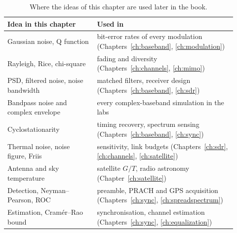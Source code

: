\begin{table}[htbp]\centering\small
\caption{Where the ideas of this chapter are used later in the book.}
\label{tab:ch03:roadmap}
\begin{tabular}{@{}p{0.36\linewidth}p{0.56\linewidth}@{}}
\toprule
Idea in this chapter & Used in \\
\midrule
Gaussian noise, Q function & bit-error rates of every modulation (Chapters~\ref{ch:baseband}, \ref{ch:modulation})\\
Rayleigh, Rice, chi-square & fading and diversity (Chapters~\ref{ch:channels}, \ref{ch:mimo})\\
PSD, filtered noise, noise bandwidth & matched filters, receiver design (Chapters~\ref{ch:baseband}, \ref{ch:sdr})\\
Bandpass noise and complex envelope & every complex-baseband simulation in the labs\\
Cyclostationarity & timing recovery, spectrum sensing (Chapters~\ref{ch:baseband}, \ref{ch:sync})\\
Thermal noise, noise figure, Friis & sensitivity, link budgets (Chapters~\ref{ch:sdr}, \ref{ch:channels}, \ref{ch:satellite})\\
Antenna and sky temperature & satellite $G/T$, radio astronomy (Chapter~\ref{ch:satellite})\\
Detection, Neyman--Pearson, ROC & preamble, PRACH and GPS acquisition (Chapters~\ref{ch:sync}, \ref{ch:spreadspectrum})\\
Estimation, Cram\'er--Rao bound & synchronisation, channel estimation (Chapters~\ref{ch:sync}, \ref{ch:equalization})\\
\bottomrule
\end{tabular}
\end{table}



